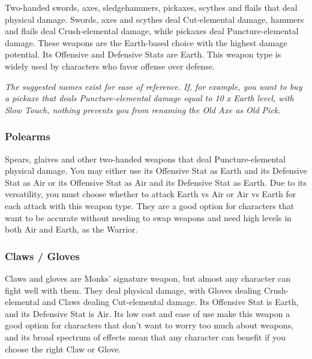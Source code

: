Two-handed swords, axes, sledgehammers, pickaxes, scythes and flails that deal physical damage. Swords, axes and scythes deal Cut-elemental damage, hammers and flails deal Crush-elemental damage, while pickaxes deal Puncture-elemental damage. These weapons are the Earth-based choice with the highest damage potential. Its Offensive and Defensive Stats are Earth. This weapon type is widely used by characters who favor offense over defense.

\begin{tabwpn}[label=inv-hwpn,range=melee,type=physical,element=crush / cut / puncture,roll=earthvearth]
    
\end{tabwpn}
{\footnotesize\textit{The suggested names exist for ease of reference. If, for example, you want to buy a pickaxe that deals Puncture-elemental damage equal to 10 x Earth level, with Slow Touch, nothing prevents you from renaming the Old Axe as Old Pick.}}
\clearpage

\subsubsection{Polearms}

Spears, glaives and other two-handed weapons that deal Puncture-elemental physical damage. You may either use its Offensive Stat as Earth and its Defensive Stat as Air or its Offensive Stat as Air and its Defensive Stat as Earth. Due to its versatility, you must choose whether to attack Earth vs Air or Air vs Earth for each attack with this weapon type. They are a good option for characters that want to be accurate without needing to swap weapons and need high levels in both Air and Earth, as the Warrior. 

\begin{tabwpn}[label=inv-pole,range=melee,type=physical,element=puncture,roll=earthvair / airvearth]
    
\end{tabwpn}
\clearpage

\subsubsection{Claws / Gloves}

Claws and gloves are Monks’ signature weapon, but almost any character can fight well with them. They deal physical damage, with Gloves dealing Crush-elemental and Claws dealing Cut-elemental damage. Its Offensive Stat is Earth, and its Defensive Stat is Air. Its low cost and ease of use make this weapon a good option for characters that don’t want to worry too much about weapons, and its broad spectrum of effects mean that any character can benefit if you choose the right Claw or Glove. 

